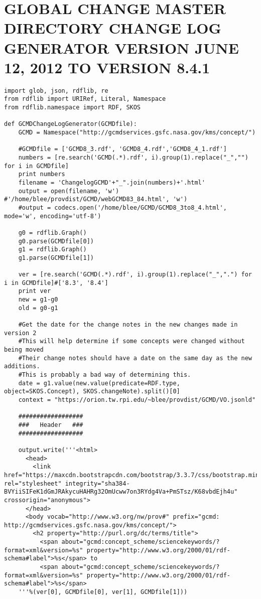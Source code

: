 \chapter{GLOBAL CHANGE MASTER DIRECTORY CHANGE LOG GENERATOR VERSION JUNE 12, 2012 TO VERSION 8.4.1}
\begin{verbatim}
import glob, json, rdflib, re
from rdflib import URIRef, Literal, Namespace
from rdflib.namespace import RDF, SKOS

def GCMDChangeLogGenerator(GCMDfile):
	GCMD = Namespace("http://gcmdservices.gsfc.nasa.gov/kms/concept/")
	
	#GCMDfile = ['GCMD8_3.rdf', 'GCMD8_4.rdf','GCMD8_4_1.rdf']
	numbers = [re.search('GCMD(.*).rdf', i).group(1).replace("_","") for i in GCMDfile]
	print numbers
	filename = 'ChangelogGCMD'+"_".join(numbers)+'.html'
	output = open(filename, 'w') #'/home/blee/provdist/GCMD/webGCMD83_84.html', 'w')
	#output = codecs.open('/home/blee/GCMD/GCMD8_3to8_4.html', mode='w', encoding='utf-8')
	
	g0 = rdflib.Graph()
	g0.parse(GCMDfile[0])
	g1 = rdflib.Graph()
	g1.parse(GCMDfile[1])
	
	ver = [re.search('GCMD(.*).rdf', i).group(1).replace("_",".") for i in GCMDfile]#['8.3', '8.4']
	print ver
	new = g1-g0
	old = g0-g1
	
	#Get the date for the change notes in the new changes made in version 2
	#This will help determine if some concepts were changed without being moved
	#Their change notes should have a date on the same day as the new additions.
	#This is probably a bad way of determining this.
	date = g1.value(new.value(predicate=RDF.type, object=SKOS.Concept), SKOS.changeNote).split()[0]
	context = "https://orion.tw.rpi.edu/~blee/provdist/GCMD/VO.jsonld"
	
	##################
	###   Header   ###
	##################
	
	output.write('''<html>
	  <head>
	    <link href="https://maxcdn.bootstrapcdn.com/bootstrap/3.3.7/css/bootstrap.min.css" rel="stylesheet" integrity="sha384-BVYiiSIFeK1dGmJRAkycuHAHRg32OmUcww7on3RYdg4Va+PmSTsz/K68vbdEjh4u" crossorigin="anonymous">
	  </head>
	  <body vocab="http://www.w3.org/nw/prov#" prefix="gcmd: http://gcmdservices.gsfc.nasa.gov/kms/concept/">
	    <h2 property="http://purl.org/dc/terms/title">
	      <span about="gcmd:concept_scheme/sciencekeywords/?format=xml&version=%s" property="http://www.w3.org/2000/01/rdf-schema#label">%s</span> to 
	      <span about="gcmd:concept_scheme/sciencekeywords/?format=xml&version=%s" property="http://www.w3.org/2000/01/rdf-schema#label">%s</span>
	'''%(ver[0], GCMDfile[0], ver[1], GCMDfile[1]))
	

\end{verbatim}
